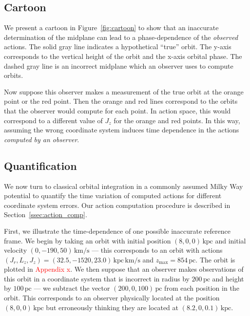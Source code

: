 \documentclass[twocolumn]{aastex62}
\newcommand{\Gus}[1]{\textcolor{red}{#1}}
\newcommand{\pc}{\text{pc}}
\newcommand{\kpc}{\text{kpc}}
\newcommand{\kms}{\text{km}/\text{s}}
\newcommand{\actunit}{\text{kpc}\,\kms}
\begin{document}
\subsection{Cartoon} \label{ssec:cartoon}
We present a cartoon in Figure~\ref{fig:cartoon} to show that an inaccurate
determination of the midplane can lead to a phase-dependence of the {\em
observed} actions. The solid gray line indicates a hypothetical ``true''
orbit. The y-axis corresponds to the vertical height of the orbit and the
x-axis orbital phase. The dashed gray line is an incorrect midplane which an
observer uses to compute orbits.

Now suppose this observer makes a measurement of the true orbit at the orange
point or the red point. Then the orange and red lines correspond to the orbits
that the observer would compute for each point. In action space, this would
correspond to a different value of $J_z$ for the orange and red points. In
this way, assuming the wrong coordinate system induces time dependence in the
actions {\em computed by an observer}.

\begin{figure*}
\caption{Cartoon showing the effect an incorrect midplane can have on orbit
integrations and as an extension on action computations. The x-axis shows the
orbital phase and the y-axis the vertical height. The top gray curve depicts a
hypothetical true orbit oscillating about the true midplane, the horizontal
solid gray line. Consider an immortal observer who erroneously assumes the
midplane is located at the horizontal dashed line. Suppose this immortal
observer measures the orbit at the blue and pink points. If the immortal
observer were to perform orbit integrations at each observation, they would
assume the blue and pink curves for the respective orbits. In this way, an
incorrect midplane will induce phase-dependence in the {\em observed}
actions.}
\label{fig:cartoon}
\end{figure*}

\subsection{Quantification} \label{ssec:quant}
We now turn to classical orbital integration in a commonly assumed Milky Way
potential to quantify the time variation of computed actions for different
coordinate system errors. Our action computation procedure is described in
Section~\ref{ssec:action_comp}.

First, we illustrate the time-dependence of one possible inaccurate reference
frame. We begin by taking an orbit with initial position $(8, 0, 0)\,\kpc$ and
initial velocity $(0, -190, 50)\,\kms$ --- this corresponds to an orbit with
actions $(J_r, L_z, J_z) = (32.5, -1520, 23.0)\,\actunit$ and
$z_{\text{max}}=854\,\pc$. The orbit is plotted in \Gus{Appendix x}. We then
suppose that an observer makes observations of this orbit in a coordinate
system that is incorrect in radius by $200\,\pc$ and height by $100\,\pc$ ---
we subtract the vector $(200, 0, 100)\,\pc$ from each position in the orbit.
This corresponds to an observer physically located at the position $(8, 0,
0)\,\kpc$ but erroneously thinking they are located at $(8.2, 0, 0.1)\,\kpc$.
\end{document}
